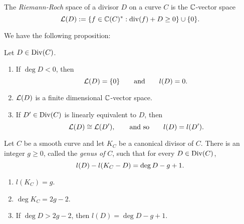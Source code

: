 \begin{defn}
	The \emph{Riemann-Roch} space of a divisor $D$ on a curve $C$ is the $\mathbb{C}$-vector space
	\begin{equation*}
		\mathcal{L}(D) := \{f \in \mathbb{C}(C)^{\ast} : \operatorname{div}(f) + D \geq 0\}\cup \{0\}.
	\end{equation*}
\end{defn}
We have the following proposition:\\
\begin{prop}
	\label{RR_prop_1}
	Let $D \in \operatorname{Div}(C)$.
	\begin{enumerate}
		\item 
		If $\deg D < 0$, then
		\begin{equation*}
			\mathcal{L}(D) = \{0\} \qquad \text{and}\qquad l(D) = 0.
		\end{equation*}
		\item
		$\mathcal{L}(D)$ is a finite dimensional $\mathbb{C}$-vector space.
		\item If $D^{\prime} \in \operatorname{Div}(C)$ is linearly equivalent to $D$, then
		\begin{equation*}
			\mathcal{L}(D) \cong \mathcal{L}(D^{\prime}),\qquad\text{and so}\qquad l(D) = l(D^{\prime}).
		\end{equation*}
	\end{enumerate}
\end{prop}

\begin{theorem}
	\label{riemann_roch}
	Let $C$ be a smooth curve and let $K_{C}$ be a canonical divisor of $C$. There is an integer $g \geq 0$, called the \emph{genus of} $C$, such that for every $D \in \operatorname{Div}(C)$,
	\begin{equation*}
		l(D) - l(K_{C} - D) = \deg D - g + 1.\\
	\end{equation*}
\end{theorem}

\begin{cor}
	\begin{enumerate}
		\label{riemann_roch_cor}
		\item $l(K_{C}) = g$.
		\item $\deg K_{C} = 2g - 2$.
		\item If $\deg D > 2g-2$, then $l(D) = \deg D - g + 1$.\\
	\end{enumerate}
\end{cor}

